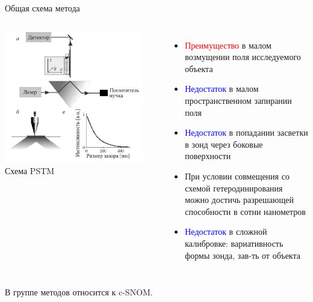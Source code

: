 \documentclass[9pt, compress, xcolor=table]{beamer}
\begin{document}
\begin{frame}{Общая схема метода}

\begin{columns}[c]
\column{6.5cm}
\begin{center}
\includegraphics[width=0.9\textwidth]{nfm17}
\newline Схема PSTM
\end{center}




\column{6cm}
\begin{itemize}
\item \textcolor{red}{Преимущество} в малом возмущении поля исследуемого объекта
\item \textcolor{blue}{Недостаток} в малом пространственном запирании поля
\item \textcolor{blue}{Недостаток} в попадании засветки в зонд через боковые поверхности
\item При условии совмещения со схемой гетеродинирования можно достичь разрешающей способности в сотни нанометров
\item \textcolor{blue}{Недостаток} в сложной калибровке: вариативность формы зонда, зав-ть от объекта
\end{itemize}
\end{columns}
В группе методов относится к c-SNOM.

\end{frame}
\end{document}
